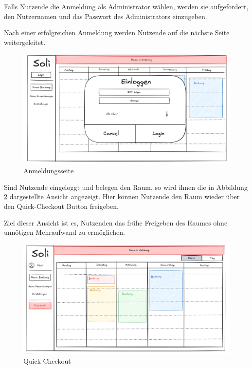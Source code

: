 Falls Nutzende die Anmeldung als Administrator wählen, werden sie aufgefordert, den Nutzernamen und das Passwort des Administrators einzugeben.

Nach einer erfolgreichen Anmeldung werden Nutzende auf die nächste Seite weitergeleitet.
\begin{figure}[ht]
    \centering
    \includegraphics[scale=0.15]{figures/ui/anmeldungsseite}
    \caption{Anmeldungsseite}
    \label{fig:login}
\end{figure}
\clearpage

Sind Nutzende eingeloggt und belegen den Raum,
so wird ihnen die in Abbildung \ref{fig:checkout} dargestellte Ansicht angezeigt.
Hier können Nutzende den Raum wieder über den Quick-Checkout Button freigeben.


Ziel dieser Ansicht ist es, Nutzenden das frühe Freigeben des Raumes ohne unnötigen Mehraufwand zu ermöglichen.
\begin{figure}[ht]
    \centering
    \includegraphics[scale=0.15]{figures/ui/checkout}
    \caption{Quick Checkout}
    \label{fig:checkout}
\end{figure}
\clearpage


